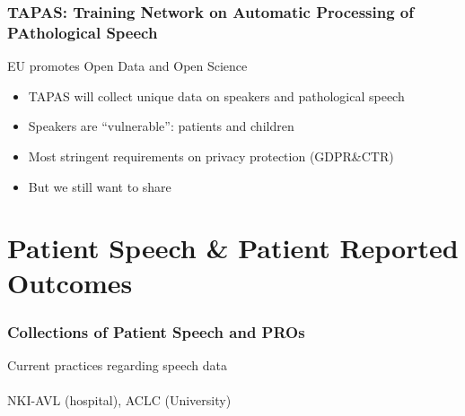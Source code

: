 \documentclass[xcolor=dvipsnames]{beamer}
\begin{document}
\begin{frame}
	\frametitle{TAPAS: Training Network on Automatic Processing of PAthological Speech}
	
	\begin{block}{EU promotes Open Data and Open Science}
	\begin{itemize}
	\item TAPAS will collect unique data on speakers and pathological speech 
	\item Speakers are ``vulnerable'': patients and children
	\item Most stringent requirements on privacy protection (GDPR\&CTR)
	\item But we still want to share
	\end{itemize}
	\end{block}	
	
\end{frame}

\section{Patient Speech \& Patient Reported Outcomes}

{
\begin{frame}
	\frametitle{Collections of Patient Speech and PROs}
	
	\vskip 5cm
	\begin{center}
	{\Large Current practices regarding speech data\\~\\{\footnotesize NKI-AVL (hospital), ACLC (University)}}
	\end{center}
\end{frame}
}
\end{document}
